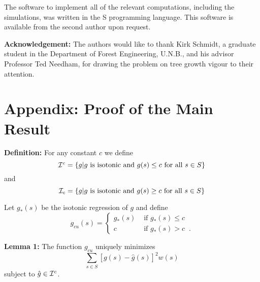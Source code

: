 The software to implement all of the relevant computations,
including the simulations, was written in the S programming
language.  This software is available from the second
author upon request.

{\bf Acknowledgement:}  The authors would like to thank
Kirk Schmidt, a graduate student in the Department of
Forest Engineering, U.N.B., and his advisor Professor Ted
Needham, for drawing the problem on tree growth vigour to
their attention.

\section{Appendix: Proof of the Main Result}

{\bf Definition:} For any constant $c$ we define
\begin{displaymath} \mbox{${\cal I}^c$} = \{g | g \mbox{ is isotonic and }
g(s) \leq c \mbox{ for all } s \in S \} \end{displaymath}
and \begin{displaymath} \mbox{${\cal I}_c$} = \{g | g \mbox{ is isotonic
and } g(s) \geq c \mbox{ for all } s \in S \}
\end{displaymath}

Let $g_*(s)$ be the isotonic regression of $g$ and define
\begin{displaymath} g_{cu}(s) = \left \{ \begin{array}{cl}
g_*(s) & \mbox{ if } g_*(s) \leq c\\ c & \mbox{ if } g_*(s)
> c \;\;.\end{array} \right.  \end{displaymath}

{\bf Lemma 1:} The function $g_{cu}$ uniquely minimizes
\begin{equation} \sum_{s \in S} [g(s) - \hat{g}(s)]^2 w(s)
\label{eq:trunciso} \end{equation} subject to $\hat{g} \in
\mbox{${\cal I}^c$}$.

